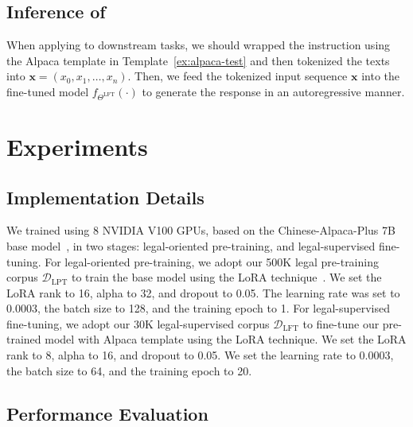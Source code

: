 \subsection{Inference of \algo}

When applying \algo to downstream tasks, we should wrapped the instruction using the Alpaca template in Template~\ref{ex:alpaca-test} and then tokenized the texts into $\boldsymbol{x} = (x_0, x_1, \ldots, x_n)$. 
Then, we feed the tokenized input sequence $\boldsymbol{x}$ into the fine-tuned model $f_{\Theta^{\text{LFT}}}(\cdot)$ to generate the response in an autoregressive manner. 

\section{Experiments}
\label{sec:experiments}

\subsection{Implementation Details}

We trained \algo using 8 NVIDIA V100 GPUs, based on the Chinese-Alpaca-Plus 7B base model~\citep{chinese-llama-alpaca}, in two stages: legal-oriented pre-training, and legal-supervised fine-tuning.
For legal-oriented pre-training, we adopt our 500K legal pre-training corpus $\mathcal{D}_{\text{LPT}}$ to train the base model using the LoRA technique~\citep{hu22lora}. We set the LoRA rank to 16, alpha to 32, and dropout to 0.05. The learning rate was set to 0.0003, the batch size to 128, and the training epoch to 1. 
For legal-supervised fine-tuning, we adopt our 30K legal-supervised corpus $\mathcal{D}_{\text{LFT}}$ to fine-tune our pre-trained model with Alpaca template using the LoRA technique. We set the LoRA rank to 8, alpha to 16, and dropout to 0.05. We set the learning rate to 0.0003, the batch size to 64, and the training epoch to 20.

\subsection{Performance Evaluation}

